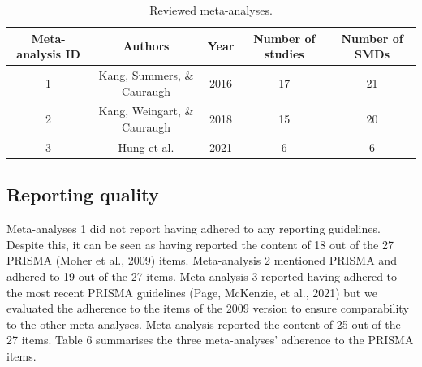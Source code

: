 \documentclass[
  man,floatsintext]{apa6}
\begin{document}
\begin{longtable}[t]{ccccc}
\caption{\label{tab:table5}Reviewed meta-analyses.}\\
\toprule
Meta-analysis ID & Authors & Year & Number of studies & Number of SMDs\\
\midrule
1 & Kang, Summers, \& Cauraugh & 2016 & 17 & 21\\
2 & Kang, Weingart, \& Cauraugh & 2018 & 15 & 20\\
3 & Hung et al. & 2021 & 6 & 6\\
\bottomrule
\end{longtable}
\endgroup{}
\doublespacing

\hypertarget{reporting-quality-2}{%
\subsection{Reporting quality}\label{reporting-quality-2}}

Meta-analyses 1 did not report having adhered to any reporting guidelines. Despite this, it can be seen as having reported the content of 18 out of the 27 PRISMA (Moher et al., 2009) items. Meta-analysis 2 mentioned PRISMA and adhered to 19 out of the 27 items. Meta-analysis 3 reported having adhered to the most recent PRISMA guidelines (Page, McKenzie, et al., 2021) but we evaluated the adherence to the items of the 2009 version to ensure comparability to the other meta-analyses. Meta-analysis reported the content of 25 out of the 27 items. Table 6 summarises the three meta-analyses' adherence to the PRISMA items.

\singlespacing
\begingroup\fontsize{10}{12}\selectfont
\end{document}
